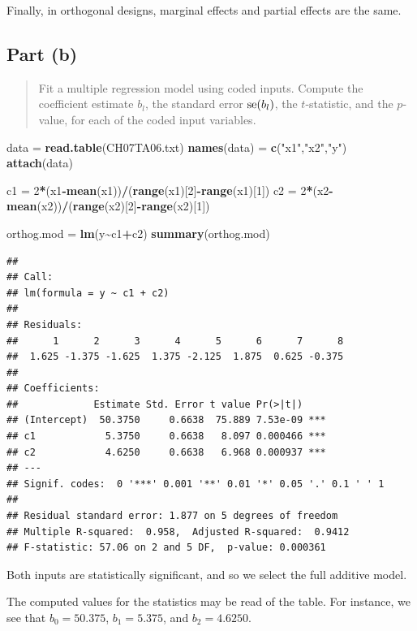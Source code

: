 \documentclass[
]{article}
\newenvironment{Shaded}{\begin{snugshade}}{\end{snugshade}}
\newcommand{\DecValTok}[1]{\textcolor[rgb]{0.00,0.00,0.81}{#1}}
\newcommand{\FunctionTok}[1]{\textcolor[rgb]{0.13,0.29,0.53}{\textbf{#1}}}
\newcommand{\NormalTok}[1]{#1}
\newcommand{\OtherTok}[1]{\textcolor[rgb]{0.56,0.35,0.01}{#1}}
\newcommand{\SpecialCharTok}[1]{\textcolor[rgb]{0.81,0.36,0.00}{\textbf{#1}}}
\newcommand{\StringTok}[1]{\textcolor[rgb]{0.31,0.60,0.02}{#1}}
\begin{document}
Finally, in orthogonal designs, marginal effects and partial effects are
the same.

\hypertarget{part-b-1}{%
\subsection{Part (b)}\label{part-b-1}}

\begin{quote}
Fit a multiple regression model using coded inputs. Compute the
coefficient estimate \(b_l\), the standard error \(\operatorname{se}(b_l)\), the
\(t\)-statistic, and the \(p\)-value, for each of the coded input
variables.
\end{quote}

\begin{Shaded}
\begin{Highlighting}[]
\NormalTok{data }\OtherTok{=} \FunctionTok{read.table}\NormalTok{(}\StringTok{\textquotesingle{}CH07TA06.txt\textquotesingle{}}\NormalTok{)}
\FunctionTok{names}\NormalTok{(data) }\OtherTok{=} \FunctionTok{c}\NormalTok{(}\StringTok{"x1"}\NormalTok{,}\StringTok{"x2"}\NormalTok{,}\StringTok{"y"}\NormalTok{)}
\FunctionTok{attach}\NormalTok{(data)}

\NormalTok{c1 }\OtherTok{=} \DecValTok{2}\SpecialCharTok{*}\NormalTok{(x1}\SpecialCharTok{{-}}\FunctionTok{mean}\NormalTok{(x1))}\SpecialCharTok{/}\NormalTok{(}\FunctionTok{range}\NormalTok{(x1)[}\DecValTok{2}\NormalTok{]}\SpecialCharTok{{-}}\FunctionTok{range}\NormalTok{(x1)[}\DecValTok{1}\NormalTok{])}
\NormalTok{c2 }\OtherTok{=} \DecValTok{2}\SpecialCharTok{*}\NormalTok{(x2}\SpecialCharTok{{-}}\FunctionTok{mean}\NormalTok{(x2))}\SpecialCharTok{/}\NormalTok{(}\FunctionTok{range}\NormalTok{(x2)[}\DecValTok{2}\NormalTok{]}\SpecialCharTok{{-}}\FunctionTok{range}\NormalTok{(x2)[}\DecValTok{1}\NormalTok{])}

\NormalTok{orthog.mod }\OtherTok{=} \FunctionTok{lm}\NormalTok{(y}\SpecialCharTok{\textasciitilde{}}\NormalTok{c1}\SpecialCharTok{+}\NormalTok{c2)}
\FunctionTok{summary}\NormalTok{(orthog.mod)}
\end{Highlighting}
\end{Shaded}

\begin{verbatim}
## 
## Call:
## lm(formula = y ~ c1 + c2)
## 
## Residuals:
##      1      2      3      4      5      6      7      8 
##  1.625 -1.375 -1.625  1.375 -2.125  1.875  0.625 -0.375 
## 
## Coefficients:
##             Estimate Std. Error t value Pr(>|t|)    
## (Intercept)  50.3750     0.6638  75.889 7.53e-09 ***
## c1            5.3750     0.6638   8.097 0.000466 ***
## c2            4.6250     0.6638   6.968 0.000937 ***
## ---
## Signif. codes:  0 '***' 0.001 '**' 0.01 '*' 0.05 '.' 0.1 ' ' 1
## 
## Residual standard error: 1.877 on 5 degrees of freedom
## Multiple R-squared:  0.958,  Adjusted R-squared:  0.9412 
## F-statistic: 57.06 on 2 and 5 DF,  p-value: 0.000361
\end{verbatim}

Both inputs are statistically significant, and so we select the full
additive model.

The computed values for the statistics may be read of the table. For
instance, we see that \(b_0 = 50.375\), \(b_1 = 5.375\), and
\(b_2 = 4.6250\).
\end{document}
